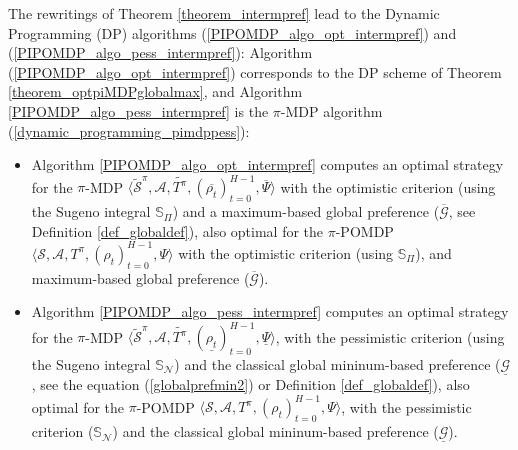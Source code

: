 The rewritings of Theorem \ref{theorem_intermpref} 
lead to the Dynamic Programming (DP) algorithms (\ref{PIPOMDP_algo_opt_intermpref}) and (\ref{PIPOMDP_algo_pess_intermpref}): 
Algorithm (\ref{PIPOMDP_algo_opt_intermpref})
corresponds to the DP scheme of Theorem \ref{theorem_optpiMDPglobalmax},
and Algorithm \ref{PIPOMDP_algo_pess_intermpref}
is the $\pi$-MDP algorithm (\ref{dynamic_programming_pimdppess}):
\begin{itemize}
\item Algorithm \ref{PIPOMDP_algo_opt_intermpref} computes an optimal strategy for the $\pi$-MDP 
$\langle \tilde{\mathcal{S}}^{\pi}, \mathcal{A}, \tilde{T^{\pi}}, (\overline{\rho_t})_{t=0}^{H-1}, \overline{\Psi} \rangle$
with the optimistic criterion (using the Sugeno integral $\mathbb{S}_{\Pi}$) 
and a maximum-based global preference ($\overline{\mathcal{G}}$, see Definition \ref{def_globaldef}),
also optimal for the $\pi$-POMDP 
$\langle \mathcal{S}, \mathcal{A}, T^{\pi}, (\rho_t)_{t=0}^{H-1}, \Psi \rangle$
with the optimistic criterion (using $\mathbb{S}_{\Pi}$), 
and maximum-based global preference ($\overline{\mathcal{G}}$).
\item Algorithm \ref{PIPOMDP_algo_pess_intermpref} computes an optimal strategy for the $\pi$-MDP 
$\langle \tilde{\mathcal{S}}^{\pi}, \mathcal{A}, \tilde{T^{\pi}}, (\underline{\rho_t})_{t=0}^{H-1}, \underline{\Psi}\rangle$,  
with the pessimistic criterion (using the Sugeno integral $\mathbb{S}_{\mathcal{N}}$) 
and the classical global mininum-based preference ($\underline{\mathcal{G}}$,
see the equation (\ref{globalprefmin2}) or Definition \ref{def_globaldef}),
also optimal for the $\pi$-POMDP 
$\langle \mathcal{S}, \mathcal{A}, T^{\pi}, (\rho_t)_{t=0}^{H-1}, \Psi \rangle$,
with the pessimistic criterion ($\mathbb{S}_{\mathcal{N}}$) 
and the classical global mininum-based preference ($\underline{\mathcal{G}}$).
\end{itemize}


